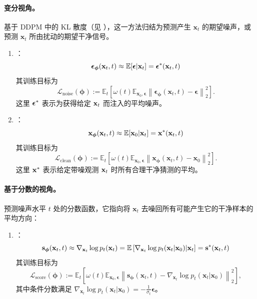 \paragraph{变分视角。} 基于 DDPM 中的 KL 散度（见 ），这一方法归结为预测产生 $\mathbf{x}_t$ 的期望噪声，或预测 $\mathbf{x}_t$ 所由扰动的期望干净信号。
\begin{enumerate}
    \item {} \citep{ho2020denoising}：
    \begin{equation}\label{eq:noise-def}
        \bm{\epsilon}_{\bm{\phi}}(\mathbf{x}_t,t) \approx \mathbb{E}[\bm{\epsilon}|\mathbf{x}_t]=\bm{\epsilon}^*({\mathbf{x}}_t, t)
    \end{equation}
    其训练目标为
    \[
        \mathcal{L}_{\text{noise}}(\bm{\phi}) := \mathbb{E}_t \left[\omega(t) \mathbb{E}_{\mathbf{x}_0, \bm{\epsilon}} \left\| \bm{\epsilon}_{\bm{\phi}}(\mathbf{x}_t,t) - \bm{\epsilon} \right\|_2^2 \right].
    \]
    这里 ${\bm{\epsilon}}^*$ 表示为获得给定 ${\mathbf{x}}_t$ 而注入的平均噪声。

    \item {} \citep{kingma2021variational,karras2022elucidating,song2023consistency}：
    \begin{equation}\label{eq:clean-def}
        \mathbf{x}_{\bm{\phi}}(\mathbf{x}_t,t) \approx \mathbb{E}[\mathbf{x}_0|\mathbf{x}_t]={\mathbf{x}}^*({\mathbf{x}}_t, t)
    \end{equation}
    其训练目标为
    \[
        \mathcal{L}_{\text{clean}}(\bm{\phi}) := \mathbb{E}_t \left[\omega(t) \mathbb{E}_{\mathbf{x}_0, \bm{\epsilon}} \left\| \mathbf{x}_{\bm{\phi}}(\mathbf{x}_t,t) - \mathbf{x}_0 \right\|_2^2 \right].
    \]
    这里 ${\mathbf{x}}^*$ 表示给定带噪观测 ${\mathbf{x}}_t$ 时所有合理干净猜测的平均。
\end{enumerate}

\paragraph{基于分数的视角。} 预测噪声水平 $t$ 处的分数函数，它指向将 $\mathbf{x}_t$ 去噪回所有可能产生它的干净样本的平均方向：
\begin{enumerate}
    \item[3.]   \citep{song2019generative,song2020score}：
    \begin{equation}\label{eq:score-def}
        \mathbf{s}_{\bm{\phi}}(\mathbf{x}_t,t) \approx \nabla_{\mathbf{x}_t} \log p_t(\mathbf{x}_t) = \mathbb{E}\left[\nabla_{\mathbf{x}_t} \log p_t(\mathbf{x}_t|\mathbf{x}_0) |\mathbf{x}_t\right] = {\mathbf{s}}^*({\mathbf{x}}_t, t)
    \end{equation}
    其训练目标为
    \[
        \mathcal{L}_{\text{score}}(\bm{\phi}) := \mathbb{E}_t \left[\omega(t) \mathbb{E}_{\mathbf{x}_0, \bm{\epsilon}} \left\| \mathbf{s}_{\bm{\phi}}(\mathbf{x}_t,t) - \nabla_{\mathbf{x}_t} \log p_t(\mathbf{x}_t|\mathbf{x}_0) \right\|_2^2 \right],
    \]
    其中条件分数满足 $\nabla_{\mathbf{x}_t} \log p_t(\mathbf{x}_t|\mathbf{x}_0) = -\frac{1}{\sigma_t} \bm{\epsilon}$。
\end{enumerate}


